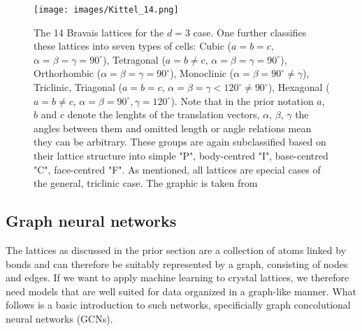 \documentclass[11pt,a4paper]{article}
\begin{document}
\begin{figure}[htbp]
    \centering
    \texttt{[image: images/Kittel\_14.png]}
    \caption{The 14 Bravais lattices for the $d=3$ case. 
    One further classifies these lattices into seven types of cells: Cubic ($a{=}b{=}c$, $\alpha {=} \beta {=} \gamma{=}90^\circ$), Tetragonal ($a{=}b {\neq} c$, $\alpha {=} \beta {=} \gamma{=}90^\circ$), Orthorhombic ($\alpha {=} \beta {=} \gamma{=} 90^\circ$), Monoclinic ($\alpha {=} \beta{=}90^\circ {\neq} \gamma$), Triclinic, Triagonal ($a{=}b{=}c$, $\alpha {=} \beta {=} \gamma <120^\circ {\neq} 90^\circ$), Hexagonal ($a{=}b{\neq} c$, $\alpha {=} \beta{=} 90^\circ, \gamma{=} 120^\circ$). 
    Note that in the prior notation $a$, $b$ and $c$ denote the lenghts of the translation vectors, $\alpha$, $\beta$, $\gamma$ the angles between them and omitted length or angle relations mean they can be arbitrary. 
    These groups are again subclassified based on their lattice structure into simple "P", body-centred "I", base-centred "C", face-centred "F". 
    As mentioned, all lattices are special cases of the general, triclinic case. The graphic is taken from \cite[Fig. 14]{kittelChapter1Crystal1971}}
    \label{fig:bravais3D}
\end{figure}

\subsection{Graph neural networks}
\label{ssec:Graph neural networks}
The lattices as discussed in the prior section are a collection of atoms linked by bonds and can therefore be suitably represented by a graph, consisting of nodes and edges. 
If we want to apply machine learning to crystal lattices, we therefore need models that are well suited for data organized in a graph-like manner. 
What follows is a basic introduction to such networks, specificially graph concolutional neural networks (GCNs). \\
\end{document}
